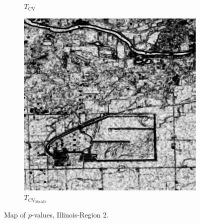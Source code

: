 \begin{figure}[H]
\begin{subfigure}[b]{0.3\textwidth}
    \caption{$T_\text{CV}$}
    \label{fig:Illinois_crops_pvalue-2}
  \end{subfigure}
  \hfill
  \begin{subfigure}[b]{0.3\textwidth}
    \centering
    \includegraphics[width=\textwidth]{../../Figures/PNG/mnad_p_values_Illinois_crops_1024}
     \caption{$T_{\text{CV}_{\text{MnAD}}}$}
    \label{fig:Illinois_crops_pvalue-3}
  \end{subfigure}
  \caption{Map of $p$-values, Illinois-Region 2. }
  \label{fig:Illinois_crops_pvalue}
\end{figure}


